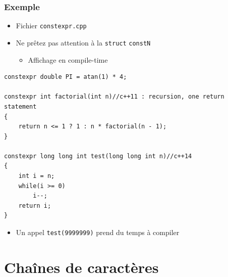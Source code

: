 \begin{frame}[containsverbatim]
\frametitle{Exemple}
\begin{itemize}
\item Fichier \texttt{constexpr.cpp}
\item Ne prêtez pas attention à la \lstinline|struct| \texttt{constN}
	\begin{itemize}
	\item Affichage en compile-time
	\end{itemize}
\end{itemize}
\begin{lstlisting}
constexpr double PI = atan(1) * 4;

constexpr int factorial(int n)//c++11 : recursion, one return statement
{
    return n <= 1 ? 1 : n * factorial(n - 1);
}

constexpr long long int test(long long int n)//c++14
{
	int i = n;
	while(i >= 0)
		i--;
	return i;
}
\end{lstlisting}
\begin{itemize}
\item Un appel \texttt{test(9999999)} prend du temps à compiler
\end{itemize}
\end{frame}

\section{Chaînes de caractères}

